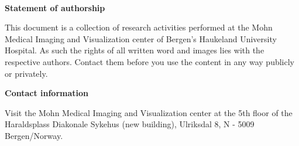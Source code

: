 \documentclass[11pt,fleqn]{book} %
\begin{document}
\renewcommand{\bibname}{References} %



\begingroup
\thispagestyle{empty}
\centering
\vspace*{11.3cm}
\par\normalfont\fontsize{35}{35}\sffamily\selectfont

\begin{center}
    \text{\color{Apricot} \mytitle}  %
    
    \text{\color{White}\ILMCode} %
    
    \color{black}\par %
    
    \vspace*{0.5cm}
\end{center}

\endgroup



\newpage
~\vfill
\thispagestyle{empty}

\noindent \textbf{Statement of authorship}
\vspace{0.5cm}

\noindent This document is a collection of research activities performed at the Mohn Medical 
Imaging and Visualization center of Bergen's Haukeland University Hospital. As such the rights
of all written word and images lies with the respective authors. Contact them before you use
the content in any way publicly or privately.
\vspace{1cm}

\noindent \textbf{Contact information}
\vspace{0.5cm}

\noindent Visit the Mohn Medical Imaging and Visualization center at the 5th floor of the Haraldsplass Diakonale Sykehus (new building), Ulriksdal 8, N - 5009 Bergen/Norway.
\vspace{1cm}
\end{document}
